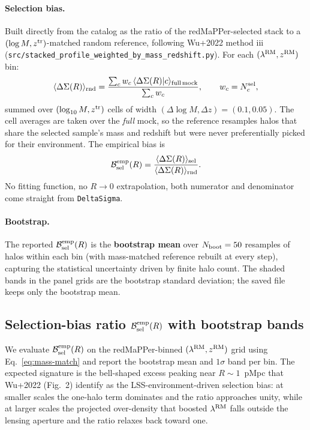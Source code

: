 \documentclass[a4paper, 11pt]{article}
\newcommand{\lrm}{\lambda^{\rm RM}}
\newcommand{\ztr}{z^{\rm tr}}
\newcommand{\zrm}{z^{\rm RM}}
\newcommand{\Bsel}{\mathcal{B}_{\rm sel}}
\newcommand{\blk}[1]{\textcolor{datablockcol}{\texttt{#1}}}
\newcommand{\pyfile}[1]{{\small\texttt{#1}}}
\begin{document}
\paragraph{Selection bias.} Built directly from the catalog as the ratio
of the redMaPPer-selected stack to a $(\log M, \ztr)$-matched random
reference, following Wu+2022 method iii
(\pyfile{src/stacked\_profile\_weighted\_by\_mass\_redshift.py}). For each
$(\lrm, \zrm)$ bin:
\begin{equation}
\label{eq:mass-match}
  \langle \Delta\Sigma(R) \rangle_{\rm rnd}
  = \frac{\sum_c w_c\, \langle\Delta\Sigma(R)|c\rangle_{\rm full\,mock}}
         {\sum_c w_c},\qquad
  w_c = N_c^{\rm sel},
\end{equation}
summed over $(\log_{10} M, \ztr)$ cells of width
$(\Delta\log M, \Delta z) = (0.1, 0.05)$. The cell averages are taken over
the \emph{full} mock, so the reference resamples halos that share the
selected sample's mass and redshift but were never preferentially picked
for their environment. The empirical bias is
\begin{equation*}
  \Bsel^{\rm emp}(R)
  = \frac{\langle \Delta\Sigma(R) \rangle_{\rm sel}}
         {\langle \Delta\Sigma(R) \rangle_{\rm rnd}}.
\end{equation*}
No fitting function, no $R \to 0$ extrapolation, both numerator and
denominator come straight from \blk{DeltaSigma}.

\paragraph{Bootstrap.} The reported $\Bsel^{\rm emp}(R)$ is the
\textbf{bootstrap mean} over $N_{\rm boot} = 50$ resamples of halos within
each bin (with mass-matched reference rebuilt at every step), capturing
the statistical uncertainty driven by finite halo count. The shaded bands
in the panel grids are the bootstrap standard deviation; the saved file
keeps only the bootstrap mean.

\subsection{Selection-bias ratio $\Bsel^{\rm emp}(R)$ with bootstrap bands}
\label{sec:emp-ratio}

We evaluate $\Bsel^{\rm emp}(R)$ on the redMaPPer-binned $(\lrm, \zrm)$
grid using Eq.~\eqref{eq:mass-match} and report the bootstrap mean and
$1\sigma$ band per bin. The expected signature is the bell-shaped excess
peaking near $R \sim 1$~pMpc that Wu+2022 (Fig.~2) identify as the
LSS-environment-driven selection bias: at smaller scales the one-halo
term dominates and the ratio approaches unity, while at larger scales
the projected over-density that boosted $\lrm$ falls outside the lensing
aperture and the ratio relaxes back toward one.
\end{document}

